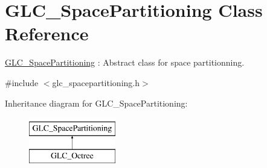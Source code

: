 \hypertarget{class_g_l_c___space_partitioning}{\section{G\-L\-C\-\_\-\-Space\-Partitioning Class Reference}
\label{class_g_l_c___space_partitioning}
}


\hyperlink{class_g_l_c___space_partitioning}{G\-L\-C\-\_\-\-Space\-Partitioning} \-: Abstract class for space partitionning.  




{\ttfamily \#include $<$glc\-\_\-spacepartitioning.\-h$>$}

Inheritance diagram for G\-L\-C\-\_\-\-Space\-Partitioning\-:\begin{figure}[H]
\begin{center}
\leavevmode
\includegraphics[height=2.000000cm]{class_g_l_c___space_partitioning}
\end{center}
\end{figure}
